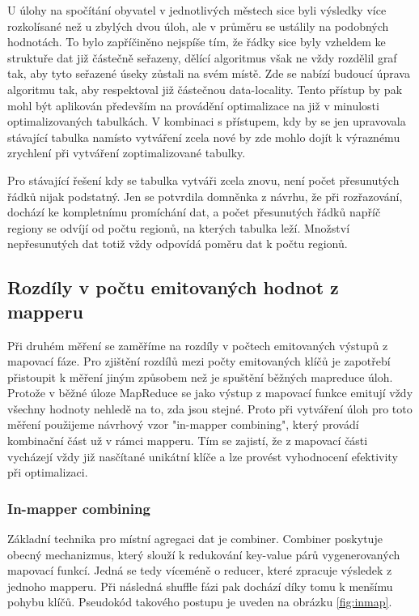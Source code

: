 \documentclass[thesis=M,czech]{FITthesis}[2012/06/26]
\begin{document}
U úlohy na spočítání obyvatel v jednotlivých městech sice byli výsledky více rozkolísané než u zbylých dvou úloh, ale v průměru se ustálily na podobných hodnotách. To bylo zapříčiněno nejspíše tím, že řádky sice byly vzheldem ke struktuře dat již částečně seřazeny, dělící algoritmus však ne vždy rozdělil graf tak, aby tyto seřazené úseky zůstali na svém místě. Zde se nabízí budoucí úprava algoritmu tak, aby respektoval již částečnou data-locality. Tento přístup by pak mohl být aplikován především na provádění optimalizace na již v minulosti optimalizovaných tabulkách. V kombinaci s přístupem, kdy by se jen upravovala stávající tabulka namísto vytváření zcela nové by zde mohlo dojít k výraznému zrychlení při vytváření zoptimalizované tabulky.

Pro stávající řešení kdy se tabulka vytváři zcela znovu, není počet přesunutých řádků nijak podstatný. Jen se potvrdila domněnka z návrhu, že při rozřazování, dochází ke kompletnímu promíchání dat, a počet přesunutých řádků napříč regiony se odvíjí od počtu regionů, na kterých tabulka leží. Množství nepřesunutých dat totiž vždy odpovídá poměru dat k počtu regionů.
 
\subsection{Rozdíly v počtu emitovaných hodnot z mapperu}
Při druhém měření se zaměříme na rozdíly v počtech emitovaných výstupů z mapovací fáze. Pro zjištění rozdílů mezi počty emitovaných klíčů je zapotřebí přistoupit k měření jiným způsobem než je spuštění běžných mapreduce úloh. Protože v běžné úloze MapReduce se jako výstup z mapovací funkce emitují vždy všechny hodnoty nehledě na to, zda jsou stejné. Proto při vytváření úloh pro toto měření použijeme návrhový vzor "in-mapper combining", který provádí kombinační část už v rámci mapperu. Tím se zajistí, že z mapovací části vycházejí vždy již nasčítané unikátní klíče a lze provést vyhodnocení efektivity při optimalizaci.

\subsubsection{In-mapper combining}
Základní technika pro místní agregaci dat je combiner. Combiner poskytuje obecný mechanizmus, který slouží k redukování key-value párů vygenerovaných mapovací funkcí. Jedná se tedy víceméně o reducer, které zpracuje výsledek z jednoho mapperu. Při následná shuffle fázi pak dochází díky tomu k menšímu pohybu klíčů.\cite{inmemory}  Pseudokód takového postupu je uveden na obrázku \ref{fig:inmap}.
\end{document}
